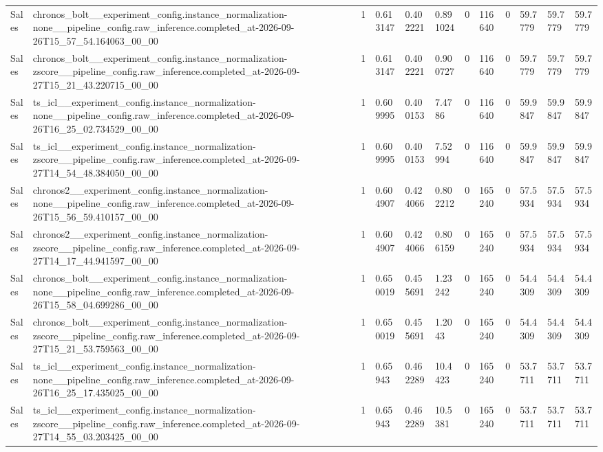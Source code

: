 \begin{tabular}{llllllllllll}
Sales & chronos\_bolt\_\_experiment\_config.instance\_normalization-none\_\_pipeline\_config.raw\_inference.completed\_at-2026-09-26T15\_57\_54.164063\_00\_00 & 1 & 0.613147 & 0.402221 & 0.891024 & 0 & 116640 & 0 & 59.7779 & 59.7779 & 59.7779 \\
Sales & chronos\_bolt\_\_experiment\_config.instance\_normalization-zscore\_\_pipeline\_config.raw\_inference.completed\_at-2026-09-27T15\_21\_43.220715\_00\_00 & 1 & 0.613147 & 0.402221 & 0.900727 & 0 & 116640 & 0 & 59.7779 & 59.7779 & 59.7779 \\
Sales & ts\_icl\_\_experiment\_config.instance\_normalization-none\_\_pipeline\_config.raw\_inference.completed\_at-2026-09-26T16\_25\_02.734529\_00\_00 & 1 & 0.609995 & 0.400153 & 7.4786 & 0 & 116640 & 0 & 59.9847 & 59.9847 & 59.9847 \\
Sales & ts\_icl\_\_experiment\_config.instance\_normalization-zscore\_\_pipeline\_config.raw\_inference.completed\_at-2026-09-27T14\_54\_48.384050\_00\_00 & 1 & 0.609995 & 0.400153 & 7.52994 & 0 & 116640 & 0 & 59.9847 & 59.9847 & 59.9847 \\
Sales & chronos2\_\_experiment\_config.instance\_normalization-none\_\_pipeline\_config.raw\_inference.completed\_at-2026-09-26T15\_56\_59.410157\_00\_00 & 1 & 0.604907 & 0.424066 & 0.802212 & 0 & 165240 & 0 & 57.5934 & 57.5934 & 57.5934 \\
Sales & chronos2\_\_experiment\_config.instance\_normalization-zscore\_\_pipeline\_config.raw\_inference.completed\_at-2026-09-27T14\_17\_44.941597\_00\_00 & 1 & 0.604907 & 0.424066 & 0.806159 & 0 & 165240 & 0 & 57.5934 & 57.5934 & 57.5934 \\
Sales & chronos\_bolt\_\_experiment\_config.instance\_normalization-none\_\_pipeline\_config.raw\_inference.completed\_at-2026-09-26T15\_58\_04.699286\_00\_00 & 1 & 0.650019 & 0.455691 & 1.23242 & 0 & 165240 & 0 & 54.4309 & 54.4309 & 54.4309 \\
Sales & chronos\_bolt\_\_experiment\_config.instance\_normalization-zscore\_\_pipeline\_config.raw\_inference.completed\_at-2026-09-27T15\_21\_53.759563\_00\_00 & 1 & 0.650019 & 0.455691 & 1.2043 & 0 & 165240 & 0 & 54.4309 & 54.4309 & 54.4309 \\
Sales & ts\_icl\_\_experiment\_config.instance\_normalization-none\_\_pipeline\_config.raw\_inference.completed\_at-2026-09-26T16\_25\_17.435025\_00\_00 & 1 & 0.65943 & 0.462289 & 10.4423 & 0 & 165240 & 0 & 53.7711 & 53.7711 & 53.7711 \\
Sales & ts\_icl\_\_experiment\_config.instance\_normalization-zscore\_\_pipeline\_config.raw\_inference.completed\_at-2026-09-27T14\_55\_03.203425\_00\_00 & 1 & 0.65943 & 0.462289 & 10.5381 & 0 & 165240 & 0 & 53.7711 & 53.7711 & 53.7711 \\

\end{tabular}
